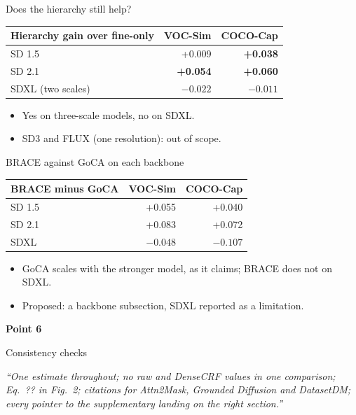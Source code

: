 \documentclass[aspectratio=169,11pt]{beamer}
\newcommand{\pointcover}[3]{%
\begin{frame}[plain]
\vfill
\begin{center}
{\LARGE\bfseries Point #1}\par\vspace{0.6em}
{\Large #2}\par\vspace{1.4em}
\begin{minipage}{0.78\linewidth}\centering\itshape #3\end{minipage}
\end{center}
\vfill
\end{frame}}
\begin{document}
\begin{frame}{Does the hierarchy still help?}
\begin{slidetable}
\begin{tabular}{@{}lrr@{}}
\toprule
Hierarchy gain over fine-only & VOC-Sim & COCO-Cap \\
\midrule
SD 1.5 & +0.009 & \textbf{+0.038} \\
SD 2.1 & \textbf{+0.054} & \textbf{+0.060} \\
SDXL (two scales) & $-0.022$ & $-0.011$ \\
\bottomrule
\end{tabular}
\end{slidetable}
\begin{itemize}
\item Yes on three-scale models, no on SDXL.
\item SD3 and FLUX (one resolution): out of scope.
\end{itemize}
\end{frame}

\begin{frame}{BRACE against GoCA on each backbone}
\begin{slidetable}
\begin{tabular}{@{}lrr@{}}
\toprule
BRACE minus GoCA & VOC-Sim & COCO-Cap \\
\midrule
SD 1.5 & +0.055 & +0.040 \\
SD 2.1 & +0.083 & +0.072 \\
SDXL & $-0.048$ & $-0.107$ \\
\bottomrule
\end{tabular}
\end{slidetable}
\begin{itemize}
\item GoCA scales with the stronger model, as it claims; BRACE does not on SDXL.
\item Proposed: a backbone subsection, SDXL reported as a limitation.
\end{itemize}
\end{frame}

\pointcover{6}{Consistency checks}{``One estimate throughout; no raw and DenseCRF values in one comparison; Eq.~?? in Fig.~2; citations for Attn2Mask, Grounded Diffusion and DatasetDM; every pointer to the supplementary landing on the right section.''}
\end{document}
